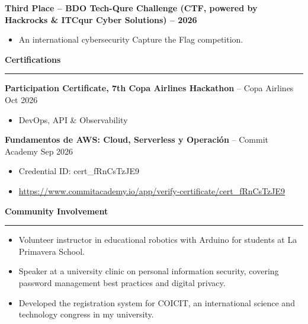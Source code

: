 \documentclass[
]{article}
\newcommand{\sect}[1]{\vspace{4pt}\noindent\textbf{#1}\par\vspace{-2pt}\noindent\rule{\linewidth}{0.4pt}\par\vspace{2pt}}
\begin{document}
\textbf{Third Place -- BDO Tech-Qure Challenge (CTF, powered by
Hackrocks \& ITCqur Cyber Solutions) -- 2026}

\begin{itemize}
\item
  An international cybersecurity Capture the Flag competition.
\end{itemize}
\vspace*{15pt}

\sect{Certifications}
\vspace*{10pt}

\textbf{Participation Certificate, 7th Copa Airlines Hackathon} -- Copa Airlines \hfill Oct 2026

\begin{itemize}
\item
  DevOps, API \& Observability
\end{itemize}
\vspace*{10pt}

\textbf{Fundamentos de AWS: Cloud, Serverless y Operación} -- Commit Academy \hfill Sep 2026

\begin{itemize}
\item
  Credential ID: cert\_fRnCsTzJE9
\item
  \url{https://www.commitacademy.io/app/verify-certificate/cert_fRnCsTzJE9}
\end{itemize}
\vspace*{15pt}

\sect{Community Involvement}
\vspace*{10pt}

\begin{itemize}
\item
  Volunteer instructor in educational robotics with Arduino for students
  at La Primavera School.
\item
  Speaker at a university clinic on personal information security,
  covering password management best practices and digital privacy.
\item
  Developed the registration system for COICIT, an international science and
  technology congress in my university.
\end{itemize}
\end{document}
